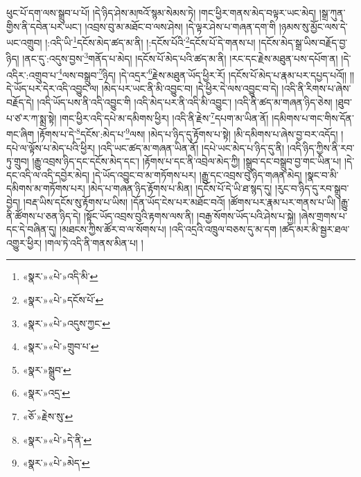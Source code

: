ཕུང་པོ་དག་ལས་སྒྲུབ་པ་པོ། །དེ་ཉིད་ཤེས་མཁའོ་སྙམ་སེམས་ཏེ། །གང་ཕྱིར་གནས་མེད་བལྟར་ཡང་མེད། །སྒྲ་ཀུན་གྱིས་ནི་དབེན་པར་ཡང་། །འབྲས་བུ་མ་མཐོང་བ་ལས་ཤེས། །དེ་ལྟར་ཤེས་པ་གཞན་དག་གི །ཉམས་སུ་མྱོང་ལས་དེ་ཡང་འགྲུབ། །:འདི་ཡི་\footnote{«སྣར་»«པེ་»འདི་མི་}དངོས་མེད་ཚད་མ་ནི། །:དངོས་པོའི་\footnote{«སྣར་»«པེ་»དངོས་པོ་}དངོས་པོ་དེ་གནས་པ། །དངོས་མེད་སྒྲ་ཡིས་བརྗོད་བྱ་ཉིད། །ནང་དུ་:འདུས་བྱས་\footnote{«སྣར་»«པེ་»འདུས་ཀྱང་}གནོད་པ་མེད། །དངོས་པོ་མེད་པའི་ཚད་མ་ནི། །རང་དང་རྗེས་མཐུན་པས་དཔོག་ན། །དེ་འདིར་:འགྲུབ་པ་\footnote{«སྣར་»«པེ་»གྲུབ་པ་}ལས་བསྒྲུབ་\footnote{«སྣར་»སྒྲུབ་}ཉིད། །དེ་འདྲར་\footnote{«སྣར་»འདྲ་}རྗེས་མཐུན་ཡོད་ཕྱིར་རོ། །དངོས་པོ་མེད་པ་རྣམ་པར་དཔྱད་པའོ།། །།དེ་ཡོད་པར་དེར་འདི་འབྱུང་ལ། །མེད་པར་ཡང་ནི་མི་འབྱུང་བ། །དེ་ཕྱིར་དེ་ལས་འབྱུང་བ་དེ། །འདི་ནི་རིགས་པ་ཞེས་བརྗོད་དེ། །འདི་ཡོད་པས་ནི་འདི་འབྱུང་གི །འདི་མེད་པར་ནི་འདི་མི་འབྱུང་། །འདི་ནི་ཚད་མ་གཞན་ཉིད་ཅེས། །ཐུབ་པ་ཙ་ར་ཀ་སྨྲ་སྟེ། །གང་ཕྱིར་འདི་དཔེ་མ་དམིགས་ཕྱིར། །འདི་ནི་རྗེས་\footnote{«ཅོ་»རྗེས་སུ་}དཔག་མ་ཡིན་ནོ། །དམིགས་པ་གང་གིས་དོན་གང་ཞིག །རྟོགས་པ་དེ་\footnote{«སྣར་»«པེ་»དེ་ནི་}དངོས་:མེད་པ་\footnote{«སྣར་»«པེ་»མེད་}ལས། །མེད་པ་ཉིད་དུ་རྟོགས་པ་སྟེ། །མི་དམིགས་པ་ཞེས་བྱ་བར་འདོད། །དཔེ་ལ་ལྟོས་པ་མེད་པའི་ཕྱིར། །འདི་ཡང་ཚད་མ་གཞན་ཡིན་ནོ། །དཔེ་ཡང་མེད་པ་ཉིད་དུ་ནི། །འདི་ཉིད་ཀྱིས་ནི་རབ་ཏུ་གྲུབ། །རྒྱུ་འབྲས་ཉིད་དང་དངོས་མེད་དང་། །རྟོགས་པ་དང་ནི་འབྲེལ་མེད་ཀྱི། །སྒྲུབ་དང་བསྒྲུབ་བྱ་གང་ཡིན་པ། །དེ་དང་འདི་ལ་འདི་དབྱེར་མེད། །དེ་ཡོད་འབྱུང་བ་མ་གཏོགས་པར། །རྒྱུ་དང་འབྲས་བུ་ཉིད་གཞན་མེད། །སྣང་བ་མི་དམིགས་མ་གཏོགས་པར། །མེད་པ་གཞན་ཉིད་རྟོགས་པ་མིན། །དངོས་པོ་དེ་ཡི་ཐ་སྙད་དུ། །རུང་བ་ཉིད་དུ་རབ་སྒྲུབ་བྱེད། །བརྡ་ཡིས་དངོས་སུ་རྟོགས་པ་ཡིས། །དོན་ཡོད་ངེས་པར་མཐོང་བའོ། །ཚོགས་པར་རྣམ་པར་གནས་པ་ཡི། །རྒྱུ་ནི་ཚོགས་པ་ཅན་ཉིད་དེ། །སྟོང་ཡོད་འབྲས་བུའི་རྟགས་ལས་ནི། །བརྒྱ་སོགས་ཡོད་པའི་ཤེས་པ་སྐྱེ། །ཞེས་གྲགས་པ་དང་དེ་བཞིན་དུ། །མཐངས་ཀྱིས་ཚོར་བ་ལ་སོགས་པ། །འདི་འདྲའི་འཁྲུལ་བཅས་དུ་མ་དག །ཚད་མར་མི་སྦྱར་ཐལ་འགྱུར་ཕྱིར། །གལ་ཏེ་འདི་ནི་གནས་མིན་པ། །
